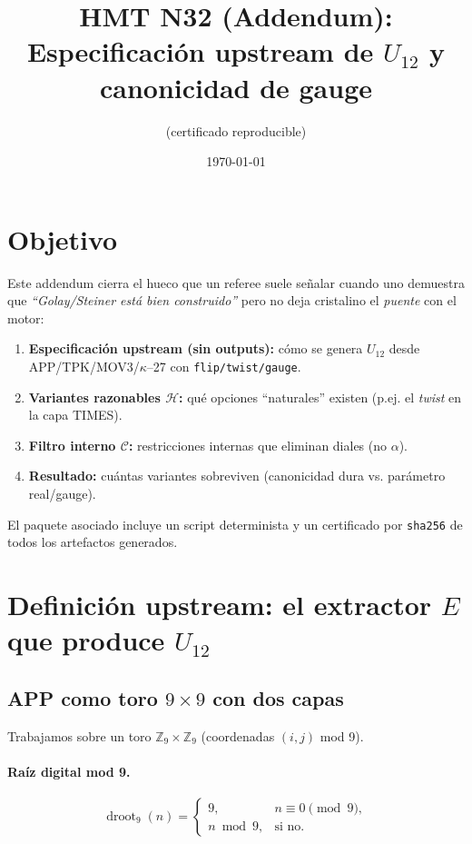 \documentclass[11pt]{article}
\title{HMT N32 (Addendum): Especificaci\'on upstream de $U_{12}$ y canonicidad de gauge}
\author{(certificado reproducible)}
\date{\today}
\begin{document}
\maketitle

\section*{Objetivo}
Este addendum cierra el hueco que un referee suele se\~nalar cuando uno demuestra que \emph{``Golay/Steiner est\'a bien construido''} pero no deja cristalino el \emph{puente} con el motor:

\begin{enumerate}
  \item \textbf{Especificaci\'on upstream (sin outputs):} c\'omo se genera $U_{12}$ desde APP/TPK/MOV3/$\kappa$--27 con \texttt{flip/twist/gauge}.
  \item \textbf{Variantes razonables $\mathcal H$:} qu\'e opciones ``naturales'' existen (p.ej. el \emph{twist} en la capa TIMES).
  \item \textbf{Filtro interno $\mathcal C$:} restricciones internas que eliminan diales (no $\alpha$).
  \item \textbf{Resultado:} cu\'antas variantes sobreviven (canonicidad dura vs. par\'ametro real/gauge).
\end{enumerate}

El paquete asociado incluye un script determinista y un certificado por \texttt{sha256} de todos los artefactos generados.

\section{Definici\'on upstream: el extractor $E$ que produce $U_{12}$}

\subsection{APP como toro $9\times 9$ con dos capas}
Trabajamos sobre un toro $\mathbb Z_9\times \mathbb Z_9$ (coordenadas $(i,j)$ mod 9).

\paragraph{Ra\'iz digital mod 9.}
\[
\operatorname{droot}_9(n)=\begin{cases}
9,& n\equiv 0\pmod 9,\\
 n\bmod 9,& \text{si no.}
\end{cases}
\]
\end{document}
